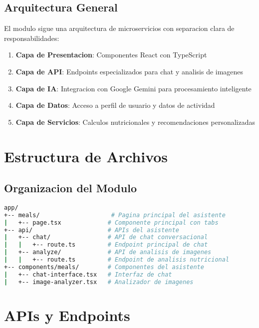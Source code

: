 \documentclass[12pt,a4paper]{article}
\begin{document}
\subsection{Arquitectura General}

El modulo sigue una arquitectura de microservicios con separacion clara de responsabilidades:

\begin{enumerate}
    \item \textbf{Capa de Presentacion}: Componentes React con TypeScript
    \item \textbf{Capa de API}: Endpoints especializados para chat y analisis de imagenes
    \item \textbf{Capa de IA}: Integracion con Google Gemini para procesamiento inteligente
    \item \textbf{Capa de Datos}: Acceso a perfil de usuario y datos de actividad
    \item \textbf{Capa de Servicios}: Calculos nutricionales y recomendaciones personalizadas
\end{enumerate}

\section{Estructura de Archivos}

\subsection{Organizacion del Modulo}

\begin{lstlisting}[language=bash, caption=Estructura de archivos del Asistente Fitness]
app/
+-- meals/                    # Pagina principal del asistente
|   +-- page.tsx             # Componente principal con tabs
+-- api/                     # APIs del asistente
|   +-- chat/                # API de chat conversacional
|   |   +-- route.ts         # Endpoint principal de chat
|   +-- analyze/             # API de analisis de imagenes
|   |   +-- route.ts         # Endpoint de analisis nutricional
+-- components/meals/        # Componentes del asistente
|   +-- chat-interface.tsx   # Interfaz de chat
|   +-- image-analyzer.tsx   # Analizador de imagenes
\end{lstlisting}

\section{APIs y Endpoints}
\end{document}
